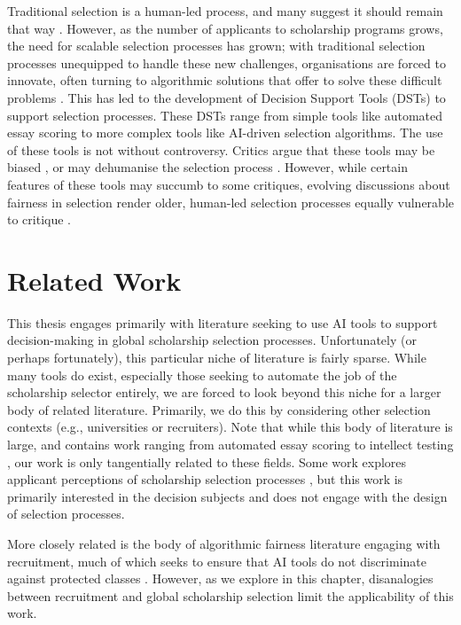 Traditional selection is a human-led process, and many suggest it should remain that way \cite{Latzer_Hollnbuchner_Just_Saurwein_2014}. However, as the number of applicants to scholarship programs grows, the need for scalable selection processes has grown; with traditional selection processes unequipped to handle these new challenges, organisations are forced to innovate, often turning to algorithmic solutions that offer to solve these difficult problems \cite{Latzer_Hollnbuchner_Just_Saurwein_2014}. This has led to the development of Decision Support Tools (DSTs) to support selection processes. These DSTs range from simple tools like automated essay scoring to more complex tools like AI-driven selection algorithms. The use of these tools is not without controversy. Critics argue that these tools may be biased \cite{dwork_fairness_2012}, or may dehumanise the selection process \cite{binns_its_2018}. However, while certain features of these tools may succumb to some critiques, evolving discussions about fairness in selection render older, human-led selection processes equally vulnerable to critique \cite{Ahnaf2023AHPAP,pmlr-v80-kearns18a}.

\section{Related Work}
This thesis engages primarily with literature seeking to use AI tools to support decision-making in global scholarship selection processes. Unfortunately (or perhaps fortunately), this particular niche of literature is fairly sparse. While many tools do exist, especially those seeking to automate the job of the scholarship selector entirely, we are forced to look beyond this niche for a larger body of related literature. Primarily, we do this by considering other selection contexts (e.g., universities or recruiters). Note that while this body of literature is large, and contains work ranging from automated essay scoring to intellect testing \cite{cozma_automated_2018,condon2014international}, our work is only tangentially related to these fields. Some work explores applicant perceptions of scholarship selection processes \textcite{10.1145/3351095.3372867}, but this work is primarily interested in the decision subjects and does not engage with the design of selection processes.

More closely related is the body of algorithmic fairness literature engaging with recruitment, much of which seeks to ensure that AI tools do not discriminate against protected classes \cite{dwork_fairness_2012}. However, as we explore in this chapter, disanalogies between recruitment and global scholarship selection limit the applicability of this work.

